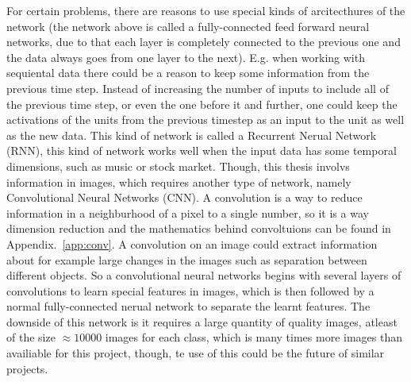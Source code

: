 For certain problems, there are reasons to use special kinds of arcitecthures of the network (the network above is called a fully-connected feed forward neural networks, due to that each layer is completely connected to the previous one and the data always goes from one layer to the next). E.g. when working with sequiental data there could be a reason to keep some information from the previous time step. Instead of increasing the number of inputs to include all of the previous time step, or even the one before it and further, one could keep the activations of the units from the previous timestep as an input to the unit as well as the new data. This kind of network is called a Recurrent Nerual Network (RNN), this kind of network works well when the input data has some temporal dimensions, such as music or stock market. Though, this thesis involvs information in images, which requires another type of network, namely Convolutional Neural Networks (CNN). A convolution is a way to reduce information in a neighburhood of a pixel to a single number, so it is a way dimension reduction and the mathematics behind convoltuions can be found in Appendix.~\ref{app:conv}. A convolution on an image could extract information about for example large changes in the images such as separation between different objects. So a convolutional neural networks begins with several layers of convolutions to learn special features in images, which is then followed by a normal fully-connected nerual network to separate the learnt features. The downside of this network is it requires a large quantity of quality images, atleast of the size $\approx 10000$ images for each class, which is many times more images than availiable for this project, though, te use of this could be the future of similar projects.
